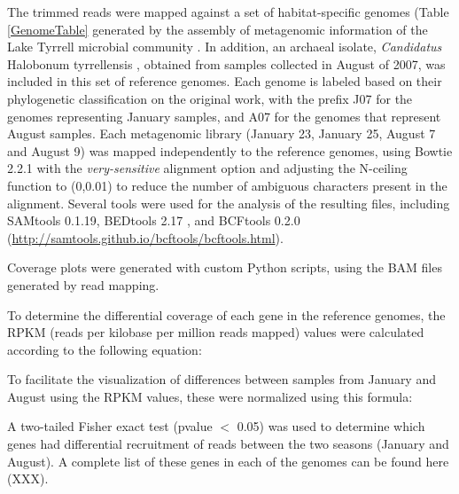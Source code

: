 The trimmed reads were mapped against a set of habitat-specific genomes (Table \ref{GenomeTable} generated by the assembly of metagenomic information of the Lake Tyrrell microbial community \cite{Narasingarao:2012kp,Podell:2013kx,Podell:2013fp}. In addition, an archaeal isolate, \textit{Candidatus} Halobonum tyrrellensis \cite{Ugalde:2013hb}, obtained from samples collected in August of 2007, was included in this set of reference genomes. Each genome is labeled based on their phylogenetic classification on the original work, with the prefix J07 for the genomes representing January samples, and A07 for the genomes that represent August samples. Each metagenomic library (January 23, January 25, August 7 and August 9) was mapped independently to the reference genomes, using Bowtie 2.2.1 \cite{Langmead:2012jh} with the \textit{very-sensitive} alignment option and adjusting the N-ceiling function to (0,0.01) to reduce the number of ambiguous characters present in the alignment. Several tools were used for the analysis of the resulting files, including SAMtools 0.1.19\cite{Li:2009ka}, BEDtools 2.17 \cite{Quinlan:2010km}, and BCFtools 0.2.0 (\url{http://samtools.github.io/bcftools/bcftools.html}).

Coverage plots were generated with custom Python scripts, using the BAM files generated by read mapping.

To determine the differential coverage of each gene in the reference genomes, the RPKM (reads per kilobase per million reads mapped) values were calculated according to the following equation:

\begin{center}
\end{center}

To facilitate the visualization of differences between samples from January and August using the RPKM values, these were normalized using this formula:

\begin{center}
\end{center}

A two-tailed Fisher exact test (pvalue $<$ 0.05) was used to determine which genes had differential recruitment of reads between the two seasons (January and August). A complete list of these genes in each of the genomes can be found here (XXX).

